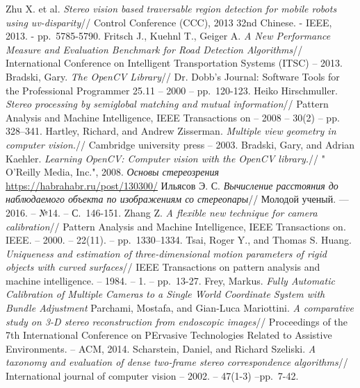 \documentclass[oneside,final,12pt]{scrartcl}
\begin{document}
	\begin{thebibliography}{00}
		 Zhu X. et al. \emph{Stereo vision based traversable region detection for mobile robots using uv-disparity}// Control Conference (CCC), 2013 32nd Chinese. - IEEE, 2013. - pp.~5785-5790.
			 	Fritsch J., Kuehnl T., Geiger A. \emph{A New Performance Measure and Evaluation Benchmark for Road Detection Algorithms}// International Conference on Intelligent Transportation Systems (ITSC) -- 2013.
		 Bradski, Gary. \emph{The OpenCV Library}// Dr. Dobb's Journal: Software Tools for the Professional Programmer 25.11 -- 2000 -- pp.~120-123.
			 Heiko Hirschmuller. \emph{Stereo processing by semiglobal matching and mutual information}// Pattern Analysis and Machine Intelligence, IEEE Transactions on -- 2008 -- 30(2) -- pp. 328–341.
		 Hartley, Richard, and Andrew Zisserman. \emph{Multiple view geometry in computer vision.}// Cambridge university press -- 2003.
	  		 Bradski, Gary, and Adrian Kaehler. \emph{Learning OpenCV: Computer vision with the OpenCV library.}// " O'Reilly Media, Inc.", 2008.
	  	 \emph{Основы стереозрения} \href{https://habrahabr.ru/post/130300/}{https://habrahabr.ru/post/130300/}
	  		 Ильясов Э. С. \emph{Вычисление расстояния до наблюдаемого объекта по изображениям со стереопары}// Молодой ученый. — 2016. -- №14. -- С.~146-151.
	  	 Zhang Z. \emph{A flexible new technique for camera calibration}// Pattern Analysis and Machine Intelligence, IEEE Transactions on. IEEE. -- 2000. -- 22(11). -- pp.~1330–1334.
	   		 Tsai, Roger Y., and Thomas S. Huang. \emph{Uniqueness and estimation of three-dimensional motion parameters of rigid objects with curved surfaces}// IEEE Transactions on pattern analysis and machine intelligence. -- 1984. -- 1. -- pp.~13-27.
	   	 Frey, Markus. \emph{Fully Automatic Calibration of Multiple Cameras to a Single World Coordinate System with Bundle Adjustment}
	   		 Parchami, Mostafa, and Gian-Luca Mariottini. \emph{A comparative study on 3-D stereo reconstruction from endoscopic images}// Proceedings of the 7th International Conference on PErvasive Technologies Related to Assistive Environments. -- ACM, 2014.
	   	 Scharstein, Daniel, and Richard Szeliski. \emph{A taxonomy and evaluation of dense two-frame stereo correspondence algorithms}// International journal of computer vision -- 2002. -- 47(1-3) --pp.~7-42.

\end{thebibliography}
\end{document}
